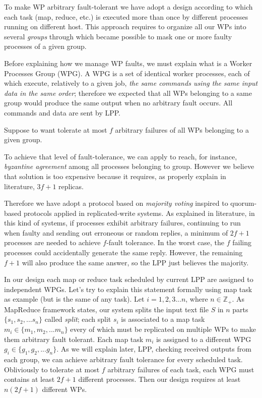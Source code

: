 \documentclass[sigchi]{acmart}
\begin{document}
To make WP arbitrary fault-tolerant we have adopt a design according to which each task (map, reduce, etc.) is executed more than once by different processes running on different host. This approach requires to organize all our WPs into several \textit{groups} through which became possible to mask one or more faulty processes of a given group. 

Before explaining how we manage WP faults, we must explain what is a Worker Processes Group (WPG). A WPG is a set of identical worker processes, each of which execute, relatively to a given job, \textit{the same commands using the same input data in the same order}; therefore we expected that all WPs belonging to a same group would produce the same output when no arbitrary fault occurs. All commands and data are sent by LPP.

Suppose to want tolerate at most $f$ arbitrary failures of all WPs belonging to a given group. 

To achieve that level of fault-tolerance, we can apply to reach, for instance, \textit{byzantine agreement} among all processes belonging to group. However we believe that solution is too expensive because it requires, as properly explain in literature\citep{SDCC}, $3f + 1$ replicas.

Therefore we have adopt a protocol based on \textit{majority voting} inspired to quorum-based protocols applied in replicated-write systems. As explained in literature\citep{SDCC}, in this kind of systems, if processes exhibit arbitrary failures, continuing to run when faulty and sending out erroneous or random replies, a minimum of $2f+1$ processes are needed to achieve $f$-fault tolerance. In the worst case, the $f$ failing processes could accidentally generate the same reply. However, the remaining $f+1$ will also produce the same answer, so the LPP just believes the majority.

In our design each map or reduce task scheduled by current LPP are assigned to independent WPGs. Let's try to explain this statement formally using map task as example (but is the same of any task). Let $i = 1,2,3...n$, where $n \in \mathbb{Z}_+$. As MapReduce framework states, our system splits the input text file $S$ in $n$ parts $\lbrace s_1, s_2, ... s_n \rbrace$ called \textit{split}; each split $s_i$ is associated to a map task $m_i \in \lbrace m_1, m_2, ... m_n \rbrace$ every of which must be replicated on multiple WPs to make them arbitrary fault tolerant. Each map task $m_i$ is assigned to a different WPG $g_i \in \lbrace g_1, g_2, ... g_n \rbrace$. As we will explain later, LPP, checking received outputs from each group, we can achieve arbitrary fault tolerance for every scheduled task. Obliviously to tolerate at most $f$ arbitrary failures of each task, each WPG must contains at least $2f+1$ different processes. Then our design requires at least $n(2f+1)$ different WPs.
\end{document}
